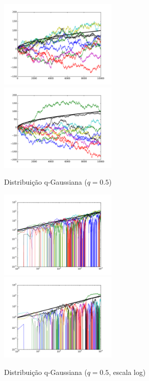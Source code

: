 \documentclass[12pt,a4paper,hidelinks]{article}
\begin{document}
  \pagebreak

  \begin{figure}[htb]
    \caption{Distribuição q-Gaussiana ($q = 0.5$)}
    \includegraphics[width=0.5\textwidth]{figures/0_5__0.pdf}
    \includegraphics[width=0.5\textwidth]{figures/0_5__1.pdf}
    \label{fig:randomwalk_q-gaussian_0.5}
  \end{figure}

  \begin{figure}[htb]
    \caption{Distribuição q-Gaussiana ($q = 0.5$, escala log)}
    \includegraphics[width=0.5\textwidth]{figures/0_5__0__log.pdf}
    \includegraphics[width=0.5\textwidth]{figures/0_5__1__log.pdf}
    \label{fig:randomwalk_q-gaussian_0.5_log}
  \end{figure}
\end{document}
